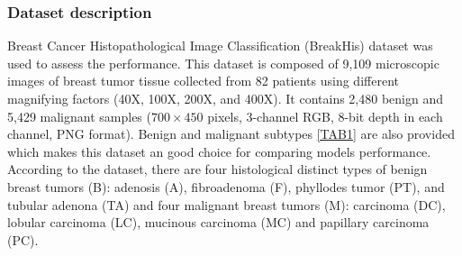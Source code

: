 \documentclass[review]{cvpr}
\begin{document}
\subsubsection{Dataset description}
Breast Cancer Histopathological Image Classification (BreakHis) dataset \cite{BENHAMMOU20209} was used to assess the performance. This dataset is composed of 9,109 microscopic images of breast tumor tissue collected from 82 patients using different magnifying factors (40X, 100X, 200X, and 400X). It contains 2,480  benign and 5,429 malignant samples ($700\times 450$ pixels, 3-channel RGB, 8-bit depth in each channel, PNG format). Benign and malignant subtypes \ref{TAB1} are also provided which makes this dataset an good choice for comparing models performance. According to the dataset, there are four histological distinct types of benign breast tumors (B): adenosis (A), fibroadenoma (F), phyllodes tumor (PT), and tubular adenona (TA) and four malignant breast tumors (M): carcinoma (DC), lobular carcinoma (LC), mucinous carcinoma (MC) and papillary carcinoma (PC). 

\begin{table}[ht]
\centering
{}
\caption{BreakHis dataset description}
\label{TAB1}
\end{table}
\end{document}
